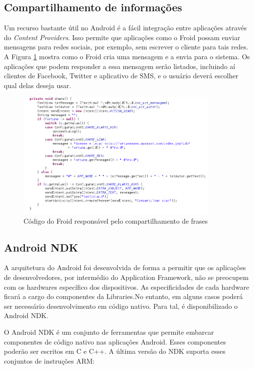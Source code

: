 \subsection{Compartilhamento de informações}

Um recurso bastante útil no Android é a fácil integração entre aplicações através 
do {\it Content Providers}.
Isso permite que aplicações como o Froid possam enviar mensagens para redes sociais,
por exemplo, sem escrever o cliente para tais redes. A Figura \ref{share} mostra 
como o Froid cria uma mensagem e a envia para o sistema. Os aplicações que podem 
responder a essa mensagem serão listados, incluindo aí clientes de Facebook, Twitter e aplicativo de SMS, e o usuário deverá escolher qual delas 
deseja usar.

\begin{figure}[h]
    \centering
    \includegraphics[width=10cm]{img/share}
    \caption{Código do Froid responsável pelo compartilhamento de frases}
    \label{share}
\end{figure}

\subsection{Android NDK}

A arquitetura do Android foi desenvolvida de forma a permitir que os aplicações de  desenvolvedores, por intermédio do Application Framework, não se preocupem com os 
hardwares específico dos dispositivos. As especificidades de cada hardware ficará a cargo 
do componentes da Libraries.No entanto, em alguns casos poderá ser necessário desenvolvimento em código nativo. Para tal, é disponibilizado o Android NDK. 

O Android NDK é um conjunto de ferramentas que permite embarcar componentes de código 
nativo nas aplicações Android. Esses componentes poderão ser escritos em C e C++.
A última versão do NDK suporta esses conjuntos de instruções ARM:

